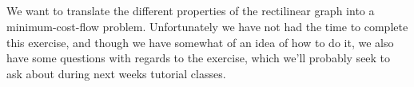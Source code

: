 
\subsection{}

We want to translate the different properties of the rectilinear graph
into a minimum-cost-flow problem. Unfortunately we have not had the
time to complete this exercise, and though we have somewhat of an idea
of how to do it, we also have some questions with regards to the
exercise, which we'll probably seek to ask about during next weeks
tutorial classes.

